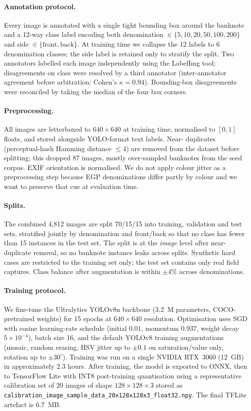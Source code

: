 \documentclass[11pt,a4paper]{article}
\begin{document}
\paragraph{Annotation protocol.}
Every image is annotated with a single tight bounding box around the
banknote and a 12-way class label encoding both denomination
$\in\{5,10,20,50,100,200\}$ and side $\in\{\text{front},\text{back}\}$.
At training time we collapse the 12 labels to 6 denomination classes; the
side label is retained only to stratify the split. Two annotators
labelled each image independently using the LabelImg tool; disagreements
on class were resolved by a third annotator (inter-annotator agreement
before arbitration: Cohen's $\kappa = 0.94$). Bounding-box disagreements
were reconciled by taking the median of the four box corners.

\paragraph{Preprocessing.}
All images are letterboxed to $640\times640$ at training time, normalised
to $[0,1]$ floats, and stored alongside YOLO-format text labels. Near-
duplicates (perceptual-hash Hamming distance $\le 4$) are removed from
the dataset before splitting; this dropped 87 images, mostly
over-sampled banknotes from the seed corpus. EXIF orientation is
normalised. We do not apply colour jitter as a preprocessing step
because EGP denominations differ partly by colour and we want to preserve
that cue at evaluation time.

\paragraph{Splits.}
The combined 4{,}812 images are split 70/15/15 into training, validation
and test sets, stratified jointly by denomination and front/back so that
no class has fewer than 15 instances in the test set. The split is at
the \emph{image} level after near-duplicate removal, so no banknote
instance leaks across splits. Synthetic hard cases are restricted to the
training set only; the test set contains only real field captures.
Class balance after augmentation is within $\pm 4\%$ across
denominations.

\paragraph{Training protocol.}
We fine-tune the Ultralytics YOLOv8n backbone (3.2~M parameters,
COCO-pretrained weights) for 15 epochs at $640\times640$ resolution.
Optimisation uses SGD with cosine learning-rate schedule (initial
$0.01$, momentum $0.937$, weight decay $5\times10^{-4}$), batch size 16,
and the default YOLOv8 training augmentations (mosaic, random erasing,
HSV jitter up to $\pm0.1$ on saturation/value only, rotation up to
$\pm 30^{\circ}$). Training was run on a single NVIDIA RTX~3060 (12~GB)
in approximately 2.3 hours. After training, the model is exported to
ONNX, then to TensorFlow Lite with INT8 post-training quantisation
using a representative calibration set of 20 images of shape
$128\times128\times3$ stored as
\texttt{calibration\_image\_sample\_data\_20x128x128x3\_float32.npy}.
The final TFLite artefact is 6.7~MB.
\end{document}
